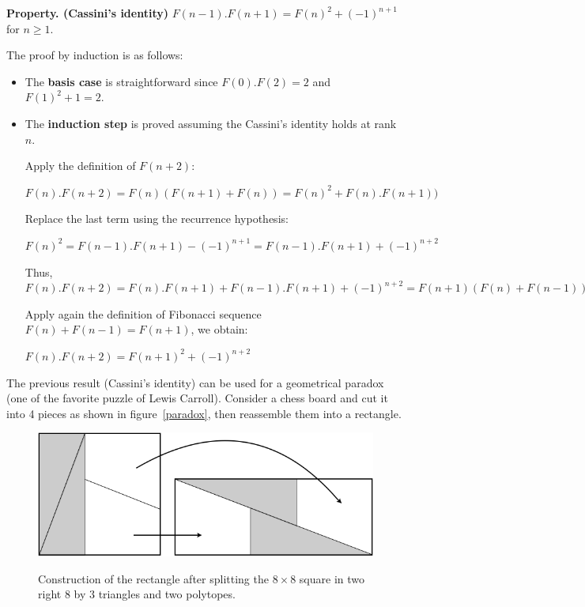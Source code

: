 \noindent \textbf{Property. (Cassini's identity)} 
\label{prop:cassini}
$F(n-1).F(n+1) = F(n)^2 + (-1)^{n+1}$ for $n \geq 1$.


The proof by induction is as follows:

\begin{itemize}
\item 
The \textbf{basis case} is straightforward since $F(0).F(2) = 2$ and $F(1)^2 +1 = 2$.

\item
The \textbf{induction step} is proved assuming the Cassini's identity holds at rank $n$.

Apply the definition of $F(n+2)$:
 
$F(n).F(n+2) = F(n) (F(n+1)+F(n)) = F(n)^2 + F(n).F(n+1))$

Replace the last term using the recurrence hypothesis:

$F(n)^2 = F(n-1).F(n+1) - (-1)^{n+1} =F(n-1).F(n+1) + (-1)^{n+2} $

Thus,
$F(n).F(n+2) = F(n).F(n+1) + F(n-1).F(n+1) + (-1)^{n+2} = F(n+1) (F(n) + F(n-1)) + (-1)^{n+2}$ 

Apply again the definition of Fibonacci sequence $F(n) + F(n-1) = F(n+1)$, we obtain:

$F(n).F(n+2) = F(n+1)^2 + (-1)^{n+2}$
\end{itemize}


The previous result (Cassini's identity) can be used for a geometrical paradox (one of the favorite puzzle of Lewis Carroll).
Consider a chess board and cut it into 4 pieces as shown in figure~\ref{paradox}, then reassemble them into a rectangle.
%
\begin{figure}[h]
\begin{center}
\label{paradox}
       \includegraphics[scale=0.4]{FiguresMaths//FiboParadox.png}
              \caption{Construction of the rectangle after splitting the $8 \times 8$ square
              in two right $8$ by $3$ triangles and two polytopes.}
        \label{fig:FiboParadox}
\end{center}
\end{figure}

